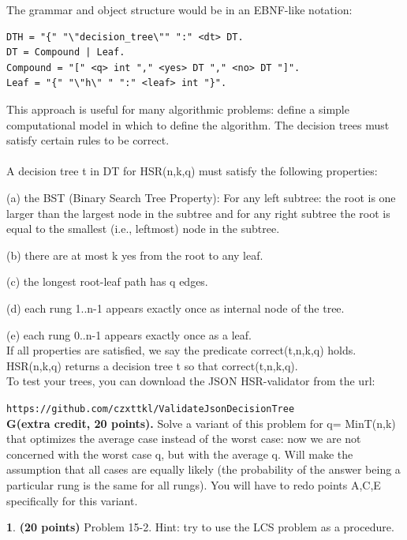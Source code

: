 \documentclass[11pt]{article}
\theoremstyle{definition}
\theoremstyle{theorem}
\newtheorem{prob}{}
\begin{document}
\noindent The grammar and object structure would be in an EBNF-like notation:

\begin{verbatim}
DTH = "{" "\"decision_tree\"" ":" <dt> DT.
DT = Compound | Leaf.
Compound = "[" <q> int "," <yes> DT "," <no> DT "]".
Leaf = "{" "\"h\" " ":" <leaf> int "}".
\end{verbatim}

\noindent This approach is useful for many algorithmic problems:  define a simple computational model in which to define the algorithm.  The decision trees must satisfy certain rules to be correct.
\\ \\
\noindent A decision tree t in DT for HSR(n,k,q) must satisfy the following properties:

(a)  the  BST  (Binary  Search  Tree  Property):  For  any  left  subtree:  the  root  is  one larger than the largest node in the subtree and for any right subtree the root is equal to the smallest (i.e., leftmost) node in the subtree.

(b)  there are at most k yes from the root to any leaf.

(c)  the longest root-leaf path has q edges.

(d)  each rung 1..n-1 appears exactly once as internal node of the tree.

(e)  each rung 0..n-1 appears exactly once as a leaf.
\\

\noindent If all properties are satisfied, we say the predicate correct(t,n,k,q) holds.  HSR(n,k,q) returns a decision tree t so that correct(t,n,k,q).
\\

\noindent To test your trees, you can download the JSON HSR-validator from the url:

\noindent\texttt{https://github.com/czxttkl/ValidateJsonDecisionTree}
\\

\noindent\textbf{G(extra credit, 20 points).} Solve a variant of this problem for q= MinT(n,k) that optimizes the average case instead of the worst case:  now we are not concerned with the worst case q, but with the average q.  Will make the assumption that all cases are equally likely (the probability of the answer being a particular rung is the same for all rungs).  You will have to redo points A,C,E specifically for this variant.


\newpage
\begin{prob} \textbf{(20 points)} Problem 15-2.  Hint:  try to use the LCS problem as a procedure.
\end{prob}
\end{document}

